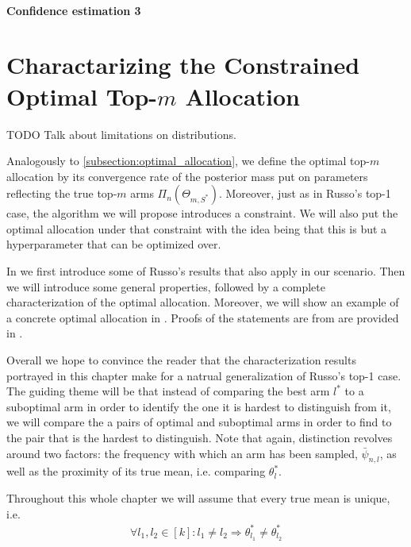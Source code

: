 \subsubsection{Confidence estimation 3}


\chapter{Charactarizing the Constrained Optimal Top-$m$ Allocation}

TODO Talk about limitations on distributions.

Analogously to \ref{subsection:optimal_allocation}, we define the optimal top-$m$ allocation by its convergence rate of the posterior mass put on parameters reflecting the true top-$m$ arms $\Pi_n(\Theta_{m, S^*})$. Moreover, just as in Russo's top-1 case, the algorithm we will propose introduces a constraint. We will also put the optimal allocation under that constraint with the idea being that this is but a hyperparameter that can be optimized over.

In  we first introduce some of Russo's results that also apply in our scenario. Then we will introduce some general properties, followed by a complete characterization of the optimal allocation. Moreover, we will show an example of a concrete optimal allocation in . Proofs of the statements are from  are provided in .

Overall we hope to convince the reader that the characterization results portrayed in this chapter make for a natrual generalization of Russo's top-1 case. The guiding theme will be that instead of comparing the best arm $l^*$ to a suboptimal arm in order to identify the one it is hardest to distinguish from it, we will compare the a pairs of optimal and suboptimal arms in order to find to the pair that is the hardest to distinguish. Note that again, distinction revolves around two factors: the frequency with which an arm has been sampled, $\bar{\psi}_{n, l}$, as well as the proximity of its true mean, i.e. comparing $\theta^*_l$.

Throughout this whole chapter we will assume that every true mean is unique, i.e.
\begin{align}
  \forall l_1, l_2 \in [k]: l_1 \neq l_2 \Rightarrow \theta^*_{l_1} \neq \theta^*_{l_2}
\end{align}

